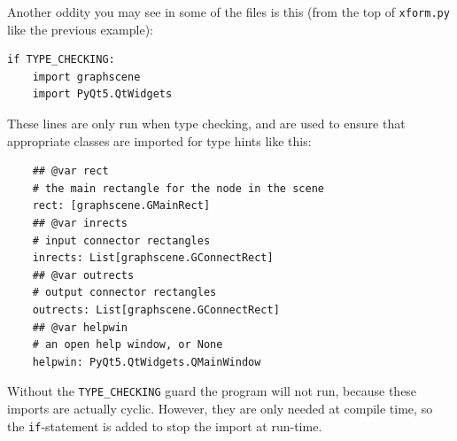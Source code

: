 Another oddity you may see in some of the files is this (from the top
of \texttt{xform.py} like the previous example):
\begin{lstlisting}
if TYPE_CHECKING:
    import graphscene
    import PyQt5.QtWidgets
\end{lstlisting}
These lines are only run when type checking, and are used to ensure
that appropriate classes are imported for type hints like this:
\begin{lstlisting}
    ## @var rect
    # the main rectangle for the node in the scene
    rect: [graphscene.GMainRect]
    ## @var inrects
    # input connector rectangles
    inrects: List[graphscene.GConnectRect]
    ## @var outrects
    # output connector rectangles
    outrects: List[graphscene.GConnectRect]
    ## @var helpwin
    # an open help window, or None
    helpwin: PyQt5.QtWidgets.QMainWindow
\end{lstlisting}
Without the \texttt{TYPE\_CHECKING} guard the program will not run, because
these imports are actually cyclic. However, they are only needed at 
compile time, so the \texttt{if}-statement is added to stop the import
at run-time.

